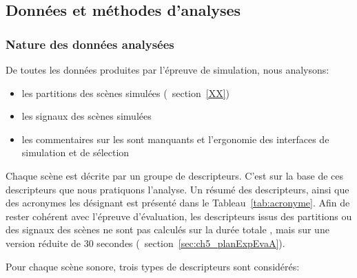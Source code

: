 \subsection{Données et méthodes d'analyses}

\subsubsection{Nature des données analysées}

De toutes les données produites par l'épreuve de simulation, nous analysons:

\begin{itemize}
\item les partitions des scènes simulées (\Cf~section~\ref{XX})
\item les signaux des scènes simulées
\item les commentaires sur les sont manquants et l'ergonomie des interfaces de simulation et de sélection
\end{itemize}

Chaque scène est décrite par un groupe de descripteurs. C'est sur la base de ces descripteurs que nous pratiquons l'analyse. Un résumé des descripteurs, ainsi que des acronymes les désignant est présenté dans le Tableau~\ref{tab:acronyme}. Afin de rester cohérent avec l'épreuve d'évaluation, les descripteurs issus des partitions ou des signaux des scènes ne sont pas calculés sur la durée totale  , mais sur une version réduite de 30 secondes (\Cf~section~\ref{sec:ch5_planExpEvaA}). 

Pour chaque scène sonore, trois types de descripteurs sont considérés:


